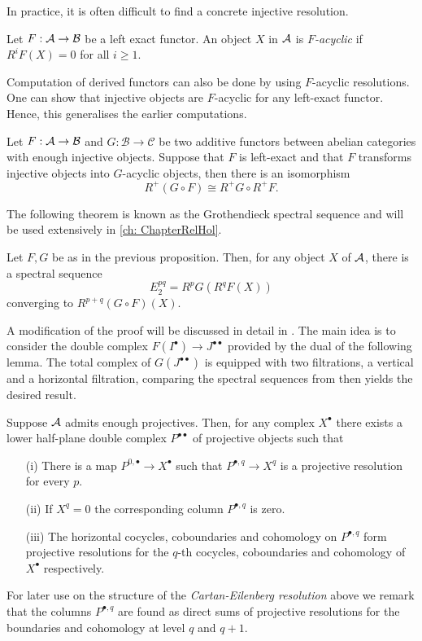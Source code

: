 In practice, it is often difficult to find a concrete injective resolution.
\begin{definition}
 Let $F:\AA \to \mathcal{B}$ be a left exact functor.
 An object $X$ in $\AA$ is {\it $F$-acyclic} if $R^iF(X) = 0$ for all $i\geq 1$.
\end{definition}
Computation of derived functors can also be done by using $F$-acyclic resolutions.
One can show that injective objects are $F$-acyclic for any left-exact functor.
Hence, this generalises the earlier computations.
\begin{proposition}{\cite[Theorem 1.3.18.]{dimca2004sheaves}}\label{prop: GrothendieckIsomorphism}
  Let $F:\AA \to \mathcal{B}$ and $G:\mathcal{B}\to \mathcal{C}$ be two additive functors between abelian categories with enough injective objects. Suppose that $F$ is left-exact and that $F$ transforms injective objects into $G$-acyclic objects, then there is an isomorphism
  $$R^+(G\circ F) \cong R^+G \circ R^+ F.$$
\end{proposition}
The following theorem is known as the Grothendieck spectral sequence and will be used extensively in \cref{ch: ChapterRelHol}.
\begin{theorem}{\cite[Theorem 1.3.19.]{dimca2004sheaves}}\label{thm: GrothendieckSpectral}
  Let $F,G$ be as in the previous proposition. Then, for any object $X$ of $\AA$, there is a spectral sequence
  $$E_2^{pq} = R^pG(R^qF(X)) $$
  converging to $R^{p+q}(G\circ F)(X).$
\end{theorem}
  A modification of the proof will be discussed in detail in .
  The main idea is to consider the double complex $F(I^\bullet)\to J^{\bullet\bullet}$ provided by the dual of the following lemma.
  The total complex of $G(J^{\bullet\bullet})$ is equipped with two filtrations, a vertical and a horizontal filtration, comparing the spectral sequences from  then yields the desired result.
\begin{proposition}{\cite[Lemma 5.7.2.]{weibel1995introduction}}\label{prop: Cartan-Eilenberg}
  Suppose $\AA$ admits enough projectives.
  Then, for any complex $X^\bullet$ there exists a lower half-plane double complex $P^{\bullet\bullet}$ of projective objects such that
  \begin{enumerate}
    \item[(i)] There is a map $P^{0,\bullet}\to X^\bullet$ such that $P^{\bullet,q}\to X^{q}$ is a projective resolution for every $p$.
    \item[(ii)] If $X^q = 0$ the corresponding column $P^{\bullet,q}$ is zero.
    \item[(iii)] The horizontal cocycles, coboundaries and cohomology on $P^{\bullet,q}$ form projective resolutions for the $q$-th cocycles, coboundaries and cohomology of $X^\bullet$ respectively.
  \end{enumerate}
\end{proposition}
For later use on the structure of the {\it Cartan-Eilenberg resolution} above we remark that the columns $P^{\bullet,q}$ are found as direct sums of projective resolutions for the boundaries and cohomology at level $q$ and $q+1$.

